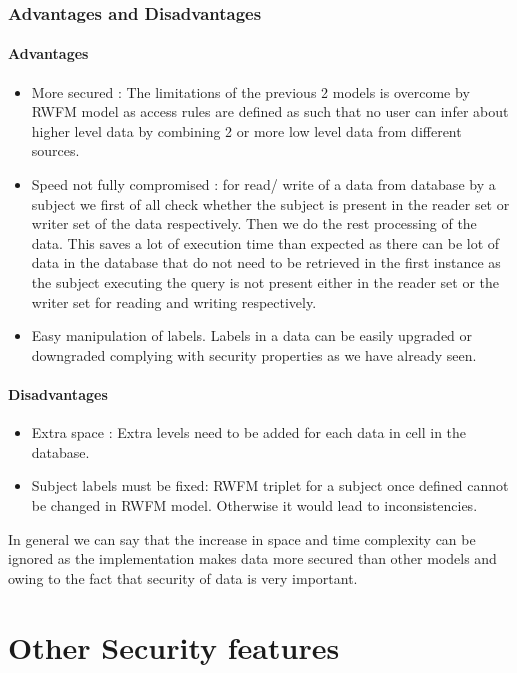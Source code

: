 \documentclass[11pt,a4paper]{report}
\begin{document}
\subsection { Advantages and Disadvantages}
\subsubsection{Advantages}
\begin{itemize}
    \item More secured : The limitations of the previous 2 models is overcome by RWFM model as access rules are defined as such that no user can infer about higher level data by combining 2 or more low level data from different sources.
    \item Speed not fully compromised : for read/ write of a data from database by a subject we first of all check whether the subject is present in  the reader set or writer set of the data respectively. Then we do the rest processing of the data. This saves a lot of execution time than expected as there can be lot of data in the database that do not need to be retrieved in the first instance as the subject executing the query is not present either in the reader set or the writer set for reading and writing respectively. 
    \item Easy manipulation of labels. Labels in a data can be easily upgraded or downgraded complying with security properties as we have already seen.
\end{itemize}
\subsubsection{Disadvantages}

\begin{itemize}
    \item Extra space : Extra levels need to be added for each data in cell in the database.  
    \item Subject labels must be fixed: RWFM triplet for a subject once defined cannot be changed in RWFM model. Otherwise it would lead to inconsistencies.
\end{itemize}

In general we can say that the increase in space and time complexity can be ignored as the implementation makes data more secured than other models and owing to the fact that security of data is very important.
\chapter{Other Security features}
\end{document}
